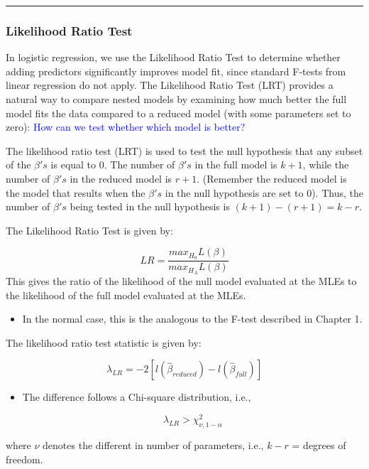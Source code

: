 \documentclass[
  letterpaper,
  DIV=11,
  numbers=noendperiod]{scrreprt}
\providecommand{\tightlist}{%
  \setlength{\itemsep}{0pt}\setlength{\parskip}{0pt}}\usepackage{longtable,booktabs,array}
\begin{document}
\begin{center}\rule{0.5\linewidth}{0.5pt}\end{center}

\hypertarget{likelihood-ratio-test}{%
\subsubsection*{Likelihood Ratio Test}\label{likelihood-ratio-test}}

In logistic regression, we use the Likelihood Ratio Test to determine
whether adding predictors significantly improves model fit, since
standard F-tests from linear regression do not apply. The Likelihood
Ratio Test (LRT) provides a natural way to compare nested models by
examining how much better the full model fits the data compared to a
reduced model (with some parameters set to zero):
\textcolor{blue}{How can we test whether which model is better?}

The likelihood ratio test (LRT) is used to test the null hypothesis that
any subset of the \(\beta's\) is equal to 0. The number of \(\beta's\)
in the full model is \(k+1\), while the number of \(\beta's\) in the
reduced model is \(r+1\). (Remember the reduced model is the model that
results when the \(\beta's\) in the null hypothesis are set to 0). Thus,
the number of \(\beta's\) being tested in the null hypothesis is
\((k+1) - (r+1) = k-r\).

\begin{tcolorbox}[enhanced jigsaw, rightrule=.15mm, breakable, left=2mm, colframe=quarto-callout-note-color-frame, opacityback=0, leftrule=.75mm, toprule=.15mm, colback=white, arc=.35mm, bottomrule=.15mm]

The Likelihood Ratio Test is given by:

\[
LR= \frac{max_{H_0}L(\beta)}{max_{H_A}L(\beta)}
\] This gives the ratio of the likelihood of the null model evaluated at
the MLEs to the likelihood of the full model evaluated at the MLEs.

\begin{itemize}
\tightlist
\item
  In the normal case, this is the analogous to the F-test described in
  Chapter 1.
\end{itemize}

The likelihood ratio test statistic is given by:

\[
\lambda_{LR} = -2[l(\hat{\beta}_{reduced}) - l(\hat{\beta}_{full})]
\]

\begin{itemize}
\item
  The difference follows a Chi-square distribution, i.e.,

  \[
  \lambda_{LR} > \chi^2_{\nu, 1-\alpha}
  \]
\end{itemize}

where \(\nu\) denotes the different in number of parameters, i.e.,
\(k-r\) = degrees of freedom.

\end{tcolorbox}
\end{document}
